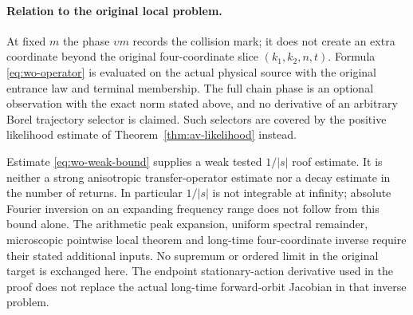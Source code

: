 \paragraph{Relation to the original local problem.}
At fixed $m$ the phase $\upsilon m$ records the collision mark;
it does not create an extra coordinate beyond the original
four-coordinate slice $(k_1,k_2,n,t)$.  Formula
\eqref{eq:wo-operator} is evaluated on the actual physical
source with the original entrance law and terminal membership.
The full chain phase is an optional observation with the exact
norm stated above, and no derivative of an arbitrary Borel
trajectory selector is claimed.  Such selectors are covered
by the positive likelihood estimate of
Theorem~\ref{thm:av-likelihood} instead.

Estimate \eqref{eq:wo-weak-bound} supplies a weak tested
$1/|s|$ roof estimate.  It is neither a strong anisotropic
transfer-operator estimate nor a decay estimate in the number
of returns.  In particular $1/|s|$ is not integrable at infinity;
absolute Fourier inversion on an expanding frequency range
does not follow from this bound alone.  The arithmetic peak
expansion, uniform spectral remainder, microscopic pointwise
local theorem and long-time four-coordinate inverse require
their stated additional inputs.  No supremum or ordered limit
in the original target is exchanged here.  The endpoint
stationary-action derivative used in the proof does not
replace the actual long-time forward-orbit Jacobian in that
inverse problem.
